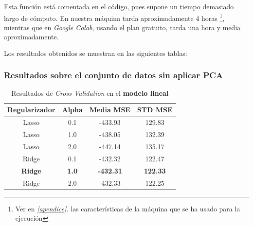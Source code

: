 \documentclass[11pt]{article}
\begin{document}
Esta función está comentada en el código, pues supone un tiempo demasiado largo de cómputo. En nuestra máquina tarda aproximadamente 4 horas \footnote{Ver en \emph{\ref{apendice}. } las características de la máquina que se ha usado para la ejecución}, mientras que en \emph{Google Colab}, usando el plan gratuito, tarda una hora y media aproximadamente.

Los resultados obtenidos se muestran en las siguientes tablas:

\subsubsection{Resultados sobre el conjunto de datos sin aplicar PCA}

\begin{table}[H]
  \centering
  \begin{tabular}{|c|c|c|c|}
  \hline
    \textbf{Regularizador} & \textbf{Alpha} & \textbf{Media MSE} & \textbf{STD MSE} \\
    \hline
    Lasso & 0.1 &  -433.93 & 129.83 \\
    Lasso & 1.0 &  -438.05 & 132.39 \\
    Lasso & 2.0 &  -447.14 & 135.17 \\
    Ridge & 0.1 & -432.32  & 122.47  \\
    \textbf{Ridge} & \textbf{1.0}    & \textbf{-432.31}& \textbf{122.33}  \\
    Ridge & 2.0  & -432.33 & 122.25  \\
    \hline
  \end{tabular}
  \caption{Resultados de \emph{Cross Validation} en el \textbf{modelo lineal}}
\end{table}
\end{document}
